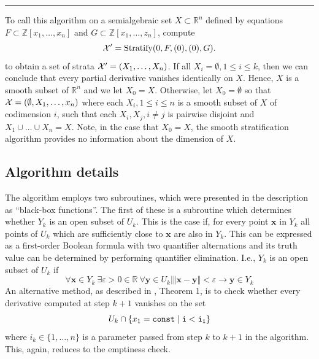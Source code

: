 \documentclass[
]{book}
\theoremstyle{definition}
\theoremstyle{definition}
\theoremstyle{definition}
\theoremstyle{definition}
\theoremstyle{remark}
\begin{document}
\begin{center}\rule{0.5\linewidth}{0.5pt}\end{center}

To call this algorithm on a semialgebraic set \(X \subset \mathbb{R}^n\) defined by equations \(F \subset \mathbb{Z}[x_1,\ldots,x_n]\) and \(G \subset \mathbb{Z}[x_1,\ldots,z_n]\), compute
\[
{\cal X}' = {\rm Stratify}(0, F, (0), (0), G).
\]
to obtain a set of strata \({\cal X'} = (X_1, \ldots, X_n)\).
If all \(X_i = \emptyset, 1 \le i \le k\), then we can conclude that every partial derivative vanishes identically on \(X\). Hence, \(X\) is a smooth subset of \(\mathbb{R}^n\) and we let \(X_0 = X\).
Otherwise, let \(X_0 = \emptyset\) so that \({\cal X} = (\emptyset, X_1,\ldots,x_n)\) where each \(X_i,1\le i \le n\) is a smooth subset of \(X\) of codimension \(i\), such that each \(X_i,X_j,i\ne j\) is pairwise disjoint and \(X_1\cup \ldots \cup X_n = X\).
Note, in the case that \(X_0 = X\), the smooth stratification algorithm provides no information about the dimension of \(X\).

\hypertarget{sec:strat-algorithm-details}{%
\subsection{Algorithm details}\label{sec:strat-algorithm-details}}

The algorithm employs two subroutines, which were presented in the description as ``black-box functions''.
The first of these is a subroutine which determines whether \(Y_k\) is an open subset of \(U_k\).
This is the case if, for every point \(\mathbf{x}\) in \(Y_k\) all points of \(U_k\) which are sufficiently close to \(\mathbf{x}\) are also in \(Y_k\).
This can be expressed as a first-order Boolean formula with two quantifier alternations and its truth value can be determined by performing quantifier elimination. I.e., \(Y_k\) is an open subset of \(U_k\) if
\[
\forall \mathbf{x} \in Y_k \> \exists \varepsilon > 0 \in \mathbb{R}\> \forall \mathbf{y} \in U_k \mid \Vert \mathbf{x} - \mathbf{y} \Vert < \varepsilon \rightarrow \mathbf{y} \in Y_k
\]
An alternative method, as described in \citet{gv1995}, Theorem 1, is to check whether every derivative computed at step \(k+1\) vanishes on the set
\[
U_k \cap \{ x_1 = \tt{const} \mid i < i_1 \}
\]
where \(i_k \in \{1,\ldots,n\}\) is a parameter passed from step \(k\) to \(k+1\) in the algorithm.
This, again, reduces to the emptiness check.
\end{document}

